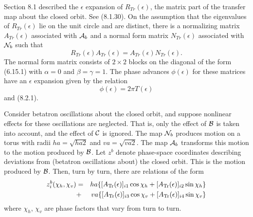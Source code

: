 Section 8.1 described the $\epsilon$ expansion of $R_{Tr} (\epsilon)$, the matrix part of the transfer map about the closed orbit.  See
(8.1.30).  On the assumption that the eigenvalues of $R_{Tr}(\epsilon
)$ lie on the unit circle and are distinct, there is a normalizing matrix
$A_{Tr}(\epsilon)$ associated with ${\cal A}_b$ and a normal form matrix $N_{Tr}(\epsilon)$
associated with ${\cal N}_b$ such that
\begin{equation}
R_{Tr}(\epsilon) A_{Tr}(\epsilon) = A_{Tr}(\epsilon) N_{Tr}(\epsilon).
\end{equation}
The normal form matrix consists of $2 \times 2$ blocks on the diagonal of
the form (6.15.1) with $\alpha = 0$ and $\beta = \gamma = 1$.  The phase advances
$\phi (\epsilon)$ for these matrices have an $\epsilon$ expansion given
by the relation
\begin{equation}
\phi (\epsilon) = 2\pi T(\epsilon)
\end{equation}
and (8.2.1).

Consider betatron oscillations about the closed orbit, and suppose nonlinear effects for these oscillations are neglected.  That is, only the effect of ${\cal B}$ is taken into account, and the effect of ${\cal C}$ is ignored.  The map ${\cal N}_b$ produces motion on a torus with radii $ha = \sqrt{ha2}$ and $va = \sqrt{va2}$.  The map ${\cal A}_b$ transforms this motion to the motion produced by ${\cal B}$.  Let $z^b$ denote phase-space coordinates describing  deviations from (betatron oscillations about) the closed orbit.  This is the motion produced  by ${\cal B}$.  Then, turn by turn, there are relations of the form
\begin{eqnarray}
z^b_i (\chi_h,\chi_v) &=& ha \{ [A_{\rm Tr} (\epsilon )]_{i1} \cos \chi_h + [A_{\rm Tr}(\epsilon )]_{i2} \sin \chi_h\} \nonumber \\
&+& va \{ [A_{\rm Tr} (\epsilon )]_{i3} \cos \chi_v + [A_{\rm Tr}(\epsilon )]_{i4} \sin \chi_v\}
\end{eqnarray}
where $\chi_h$, $\chi_v$ are phase factors that vary from turn to turn.

